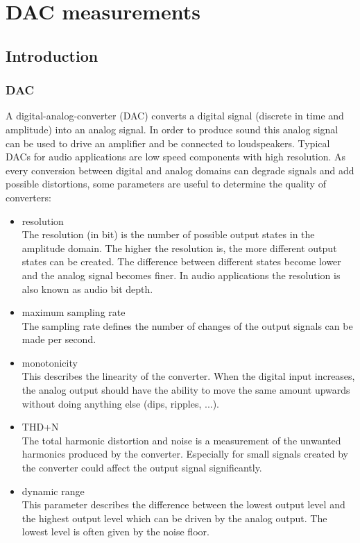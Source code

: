 \documentclass[11pt]{report}
\begin{document}
\chapter{DAC measurements}
\section{Introduction}
\subsection{DAC}
A digital-analog-converter (DAC) converts a digital signal (discrete in time and amplitude) into an analog signal. In order to produce sound this analog signal can be used to drive an amplifier and be connected to loudspeakers. Typical DACs for audio applications are low speed components with high resolution. As every conversion between digital and analog domains can degrade signals and add possible distortions, some parameters are useful to determine the quality of converters:
\begin{itemize}
\item resolution\\
The resolution (in bit) is the number of possible output states in the amplitude domain. The higher the resolution is, the more different output states can be created. The difference between different states become lower and the analog signal becomes finer. In audio applications the resolution is also known as audio bit depth.
\item maximum sampling rate\\
The sampling rate defines the number of changes of the output signals can be made per second.
\item monotonicity\\
This describes the linearity of the converter. When the digital input increases, the analog output should have the ability to move the same amount upwards without doing anything else (dips, ripples, ...).
\item THD+N\\
The total harmonic distortion and noise is a measurement of the unwanted harmonics produced by the converter. Especially for small signals created by the converter could affect the output signal significantly. 
\item dynamic range\\
This parameter describes the difference between the lowest output level and the highest output level which can be driven by the analog output. The lowest level is often given by the noise floor.

\end{itemize}
\end{document}
